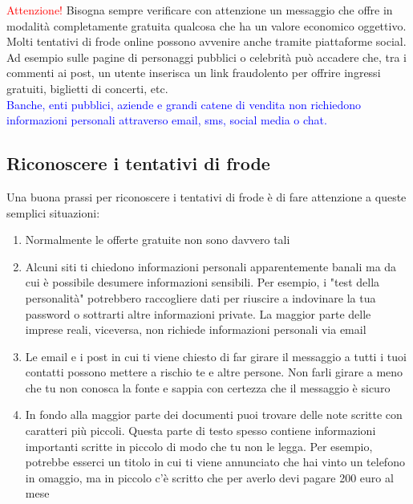 \documentclass{article}
\begin{document}
\textcolor{red}{Attenzione!} Bisogna sempre verificare con attenzione un messaggio che offre in modalità completamente gratuita qualcosa che ha un valore economico oggettivo.\\
Molti tentativi di frode online possono avvenire anche tramite piattaforme social. Ad esempio sulle pagine di personaggi pubblici o celebrità può accadere che, tra i commenti ai post, un utente inserisca un link fraudolento per offrire ingressi gratuiti, biglietti di concerti, etc.\\
\textcolor{blue}{Banche, enti pubblici, aziende e grandi catene di vendita non richiedono informazioni personali attraverso email, sms, social media o chat.}
\subsection{Riconoscere i tentativi di frode}
Una buona prassi per riconoscere i tentativi di frode è di fare attenzione a queste semplici situazioni:
\begin{enumerate}
	\item Normalmente le offerte gratuite non sono davvero tali
	\item Alcuni siti ti chiedono informazioni personali apparentemente banali ma da cui è possibile desumere informazioni sensibili. Per esempio, i "test della personalità" potrebbero raccogliere dati per riuscire a indovinare la tua password o sottrarti altre informazioni private. La maggior parte delle imprese reali, viceversa, non richiede informazioni personali via email
	\item Le email e i post in cui ti viene chiesto di far girare il messaggio a tutti i tuoi contatti possono mettere a rischio te e altre persone. Non farli girare a meno che tu non conosca la fonte e sappia con certezza che il messaggio è sicuro
	\item In fondo alla maggior parte dei documenti puoi trovare delle note scritte con caratteri più piccoli. Questa parte di testo spesso contiene informazioni importanti scritte in piccolo di modo che tu non le legga. Per esempio, potrebbe esserci un titolo in cui ti viene annunciato che hai vinto un telefono in omaggio, ma in piccolo c'è scritto che per averlo devi pagare 200 euro al mese
\end{enumerate}
\end{document}
